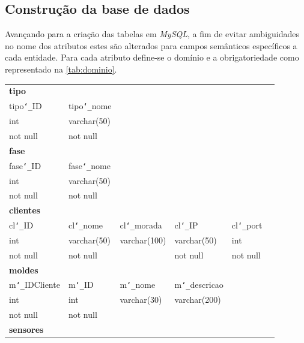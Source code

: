 \documentclass[11pt,twoside,a4paper]{report}
\begin{document}
\newpage
\subsection{Construção da base de dados}
Avançando para a criação das tabelas em \textit{MySQL}, a fim de evitar ambiguidades no nome dos atributos estes são alterados para campos semânticos específicos a cada entidade. Para cada atributo define-se o domínio e a obrigatoriedade como representado na \autoref{tab:dominio}.
\begin{table}[H]
	\centering
	\begin{tabular}{|l|l|l|l|l|l|}
		\multicolumn{6}{l}{\textbf{tipo}}\\ \cline{1-2}
		tipo\texttt{\char`_}ID & tipo\texttt{\char`_}nome & \multicolumn{4}{l}{}\\ \cline{1-2}
		int & varchar(50) & \multicolumn{4}{l}{}\\ \cline{1-2}
		not null & not null & \multicolumn{4}{l}{}\\ \cline{1-2}
		\multicolumn{6}{l}{\textbf{fase}}\\ \cline{1-2}
		fase\texttt{\char`_}ID & fase\texttt{\char`_}nome & \multicolumn{4}{l}{}\\ \cline{1-2}
		int & varchar(50) & \multicolumn{4}{l}{}\\ \cline{1-2}
		not null & not null & \multicolumn{4}{l}{}\\ \cline{1-2}
		\multicolumn{6}{l}{\textbf{clientes}}\\ \cline{1-5}
		cl\texttt{\char`_}ID & cl\texttt{\char`_}nome & cl\texttt{\char`_}morada & cl\texttt{\char`_}IP & cl\texttt{\char`_}port & \multicolumn{1}{l}{}\\ \cline{1-5}
		int & varchar(50) & varchar(100) & varchar(50) & int & \multicolumn{1}{l}{}\\ \cline{1-5}
		not null & not null & & not null & not null & \multicolumn{1}{l}{}\\ \cline{1-5}
		\multicolumn{6}{l}{\textbf{moldes}}\\ \cline{1-4}
		m\texttt{\char`_}IDCliente & m\texttt{\char`_}ID & 
		m\texttt{\char`_}nome & 
		m\texttt{\char`_}descricao & \multicolumn{2}{l}{}\\ \cline{1-4}
		int & int & varchar(30) & varchar(200) & \multicolumn{2}{l}{}\\ \cline{1-4}
		not null & not null & & &  \multicolumn{2}{l}{}\\ \cline{1-4}
		\multicolumn{6}{l}{\textbf{sensores}}\\ \cline{1-5}

\end{tabular}
\end{table}
\end{document}
